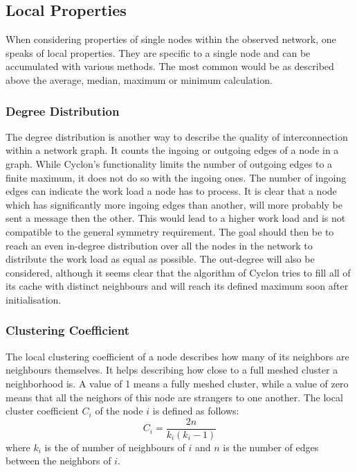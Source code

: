 \subsection{Local Properties}
When considering properties of single nodes within the observed network, one
speaks of local properties. They are specific to a single node and can be
accumulated with various methods. The most common would be as described above
the average, median, maximum or minimum calculation. 
\subsubsection{Degree Distribution}
The degree distribution is another way to describe the quality of
interconnection within a network graph. It counts the ingoing or outgoing edges
of a node in a graph. While Cyclon's functionality limits the number of outgoing
edges to a finite maximum, it does not do so with the ingoing ones. The number
of ingoing edges can indicate the work load a node has to process. It is clear that
a node which has significantly more ingoing edges than another, will more
probably be sent a message then the other. This would lead to a higher work
load and is not compatible to the general symmetry requirement. The goal should then be
to reach an even in-degree distribution over all the nodes in the network to
distribute the work load as equal as possible. The out-degree will also be
considered, although it seems clear that the algorithm of Cyclon tries to fill
all of its cache with distinct neighbours and will reach its defined maximum
soon after initialisation.
\subsubsection{Clustering Coefficient}
The local clustering coefficient \cite{watts1998collective} of a node describes
how many of its neighbors are neighbours themselves. It helps describing how
close to a full meshed cluster a neighborhood is. A value of 1 means a fully
meshed cluster, while a value of zero means that all the neighors of this node
are strangers to one another. The local cluster coefficient $C_i$ of the node
$i$ is defined as follows:
\[C_i = \frac{2n}{k_i(k_i-1)}\]
where $k_i$ is the of number of neighbours of $i$ and $n$ is the number of edges
between the neighbors of $i$.
